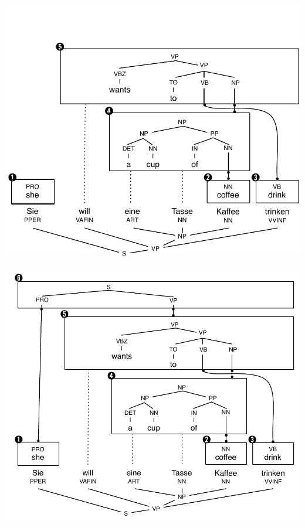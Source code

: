 \documentclass[landscape]{uedslides2C}
\begin{document}

\vspace{-31mm}
\begin{center}
\includegraphics[scale=1.15]{chart-parsing5.pdf}
\end{center}


\vspace{-31mm}
\begin{center}
\includegraphics[scale=1.15]{chart-parsing.pdf}
\end{center}
\end{document}
